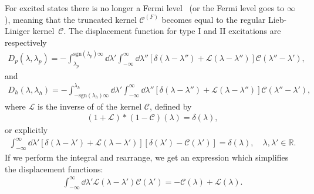 \documentclass[11pt, a4paper]{report} %
\begin{document}
For excited states there is no longer a Fermi level~\cite{Caux2015} (or the Fermi level goes to \(\infty\)), meaning that the truncated kernel \(\mathcal{C}^{(F)}\) becomes equal to the regular Lieb-Liniger kernel~\(\mathcal{C}\).
The displacement function for type I and II excitations are respectively~\cite{Caux2015}
\begin{align}
	D_p(\lambda, \lambda_p) = - \int_{\lambda_p}^{\textrm{sgn}(\lambda_p)\infty} \dd \lambda' \int_{-\infty}^{\infty} \dd  \lambda'' \left[\delta(\lambda-\lambda'') + \mathcal{L}(\lambda-\lambda'') \right]\mathcal{C}(\lambda''-\lambda'),
\end{align}
and
\begin{align}
	D_h(\lambda, \lambda_h) = - \int_{-\textrm{sgn}(\lambda_h)\infty}^{\lambda_h} \dd \lambda' \int_{-\infty}^{\infty} \dd \lambda'' \left[\delta(\lambda-\lambda'') + \mathcal{L}(\lambda - \lambda'') \right]\mathcal{C}(\lambda''-\lambda'),
\end{align}
where \(\mathcal{L}\) is the inverse of of the kernel \(\mathcal{C}\), defined by~\cite{Yang1969}
\begin{align}
	(1+\mathcal{L})*(1-\mathcal{C})(\lambda) = \delta(\lambda),
\end{align}
or explicitly
\begin{align}
	\int_{-\infty}^{\infty} \dd \lambda' \left[ \delta(\lambda-\lambda') + \mathcal{L}(\lambda-\lambda') \right] \left[ \delta(\lambda') - \mathcal{C}(\lambda')\right] = \delta(\lambda), \quad \lambda, \lambda' \in \mathbb{R}.
\end{align}
If we perform the integral and rearrange, we get an expression which simplifies the displacement functions:
\begin{align}\label{eq:kernelinversion}
	\int_{-\infty}^{\infty} \dd \lambda' \mathcal{L}(\lambda-\lambda') \mathcal{C}(\lambda') = -\mathcal{C}(\lambda) + \mathcal{L}(\lambda).
\end{align}
\end{document}
